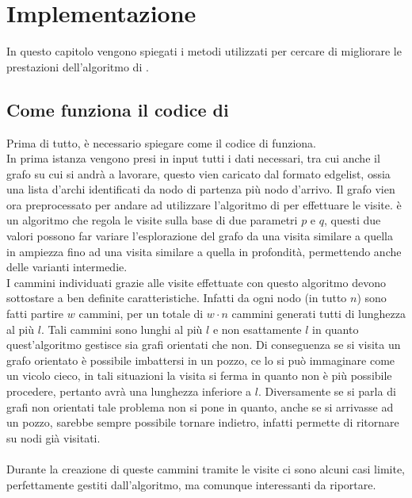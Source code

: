 %
%
%
\chapter{Implementazione}
In questo capitolo vengono spiegati i metodi utilizzati per cercare di migliorare le prestazioni dell'algoritmo di \cnrl.
%
\section{Come funziona il codice di \cnrl}
Prima di tutto, è necessario spiegare come il codice di \cnrl funziona.\\
In prima istanza vengono presi in input tutti i dati necessari, tra cui anche il grafo su cui si andrà a lavorare, questo vien caricato dal formato edgelist, ossia una lista d'archi identificati da nodo di partenza più nodo d'arrivo. Il grafo vien ora preprocessato per andare ad utilizzare l'algoritmo di \nv per effettuare le visite. \nv è un algoritmo che regola le visite sulla base di due parametri $p$ e $q$, questi due valori possono far variare l'esplorazione del grafo da una visita similare a quella in ampiezza fino ad una visita similare a quella in profondità, permettendo anche delle varianti intermedie.\\
I cammini individuati grazie alle visite effettuate con questo algoritmo devono sottostare a ben definite caratteristiche. Infatti da ogni nodo (in tutto $n$) sono fatti partire $w$ cammini, per un totale di $w \cdot n$ cammini generati tutti di lunghezza al più $l$. Tali cammini sono lunghi al più  $l$ e non esattamente $l$ in quanto quest'algoritmo gestisce sia grafi orientati che non. Di conseguenza se si visita un grafo orientato è possibile imbattersi in un pozzo, ce lo si può immaginare come un vicolo cieco, in tali situazioni la visita si ferma in quanto non è più possibile procedere, pertanto avrà una lunghezza inferiore a $l$. Diversamente se si parla di grafi non orientati tale problema non si pone in quanto, anche se si arrivasse ad un pozzo, sarebbe sempre possibile tornare indietro, infatti \nv permette di ritornare su nodi già visitati.\\
\\
Durante la creazione di queste cammini tramite le visite ci sono alcuni casi limite, perfettamente gestiti dall'algoritmo, ma comunque interessanti da riportare.
